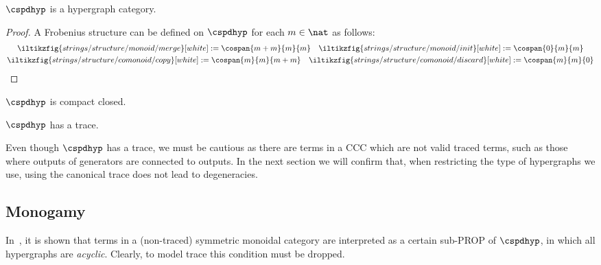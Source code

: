 \begin{proposition}\label{prop:frobenius-map}
    \(\cspdhyp\) is a hypergraph category.
\end{proposition}
\begin{proof}
    A Frobenius structure can be defined on \(\cspdhyp\) for each \(m \in \nat\)
    as follows:
    \begin{gather*}
        \iltikzfig{strings/structure/monoid/merge}[white]
        :=
        \cospan{m + m}{m}{m}
        \quad
        \iltikzfig{strings/structure/monoid/init}[white]
        :=
        \cospan{0}{m}{m}
        \\
        \iltikzfig{strings/structure/comonoid/copy}[white]
        :=
        \cospan{m}{m}{m+m}
        \quad
        \iltikzfig{strings/structure/comonoid/discard}[white]
        :=
        \cospan{m}{m}{0}
        \qedhere
    \end{gather*}
\end{proof}

\begin{corollary}
    \(\cspdhyp\) is compact closed.
\end{corollary}

\begin{corollary}
    \(\cspdhyp\) has a trace.
\end{corollary}

Even though \(\cspdhyp\) has a trace, we must be cautious as there are terms in
a CCC which are not valid traced terms, such as those where
outputs of generators are connected to outputs.
In the next section we will confirm that, when restricting the type of
hypergraphs we use, using the canonical trace does not lead to degeneracies.

\subsection{Monogamy}

In~\cite{bonchi2016rewriting}, it is shown that terms in a (non-traced)
symmetric monoidal category are interpreted as a certain sub-PROP of
\(\cspdhyp\), in which all hypergraphs are \emph{acyclic}.
Clearly, to model trace this condition must be dropped.

